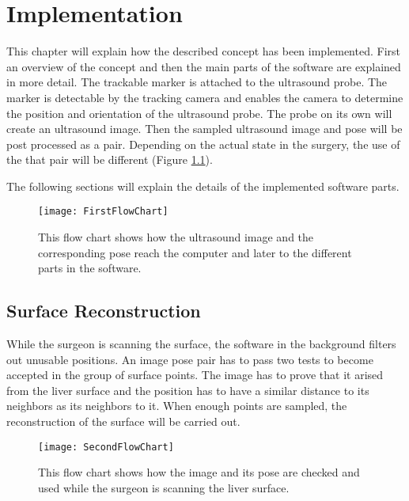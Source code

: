 \chapter{Implementation}
This chapter will explain how the described concept has been implemented.
First an overview of the concept and then the main parts of the software are explained in more
detail.
The trackable marker is attached to the ultrasound probe. The marker is
detectable by the tracking camera and enables the camera to determine the
position and orientation of the ultrasound probe. The probe on its own will
create an ultrasound image. Then the sampled ultrasound image and pose will be
post processed as a pair. Depending on the
actual state in the surgery, the use of the that pair will be different (Figure \ref{fig:FirstFlowChart}).

The following sections will explain the details of the implemented software
parts. 

\begin{figure}[H]
  \centering
 \texttt{[image: FirstFlowChart]}
  \caption{This flow chart shows how the ultrasound image and the corresponding pose reach the
    computer and later to the different parts in the software.}
  \label{fig:FirstFlowChart}
\end{figure}

\section{Surface Reconstruction}
While the surgeon is scanning the surface, the software in the background
filters out unusable positions. An image pose pair has to pass two tests to
become accepted in the group of surface points. The image has to prove that it
arised from the liver surface and the position has to have a similar distance to
its neighbors as its neighbors to it. 
When enough points are sampled, the reconstruction of the surface will be
carried out.
\begin{figure}[H]
  \centering
 \texttt{[image: SecondFlowChart]}
  \caption{This flow chart shows how the image and its pose are checked and used
    while the surgeon is scanning the
    liver surface.}
  \label{fig:SecondFlowChart}
\end{figure}

